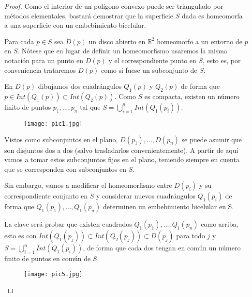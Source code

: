 \begin{proof}

	Como el interior de un polígono convexo puede ser triangulado por métodos elementales, bastará demostrar que la superficie $S$ dada es homeomorfa a una superficie con un embebimiento bicelular.

	Para cada $p \in S$ sea $D(p)$ un disco abierto en $\mathbb{R}^2$ homeomorfo a un entorno de $p$ en $S$. Nótese que en lugar de definir un homeomorfismo usaremos la misma notación para un punto en $D(p)$ y el correspondiente punto en $S$, esto es,  por conveniencia trataremos $D(p)$ como si fuese un subconjunto de $S$.

	En $D(p)$ dibujamos dos cuadrángulos $Q_{1}(p)$ y $Q_{2}(p)$ de forma que $p \in Int(Q_{1}(p)) \subset Int(Q_{2}(p))$. Como $S$ es  compacta, existen un número finito de puntos $p_{1},...,p_{n}$ tal que $S = \bigcup_{i = 1}^{n} Int(Q_{1}(p_{i}))$.

\begin{figure}[h]
\centering
\begin{minipage}[c]{\textwidth}
\centering
    \texttt{[image: pic1.jpg]}
\end{minipage}
\end{figure}

	Vistos como subconjuntos en el plano, $D(p_{1}),...,D(p_{n})$ se puede asumir que son disjuntos dos a dos (salvo trasladarlos convenientemente). A partir de aquí vamos a tomar estos subconjuntos fijos en el plano, teniendo siempre en cuenta que se corresponden con subconjuntos en $S$.

	Sin embargo, vamos a modificar el homeomorfismo entre $D(p_i)$ y su correspondiente conjunto en $S$ y considerar nuevos cuadrángulos $Q_{1}(p_i)$ de forma que $Q_{1}(p_{1}),...,Q_{1}(p_{n})$  determinen un embebimiento bicelular en S.

La clave será probar que existen cuadrados  $Q_{1}(p_{1}),...,Q_{1}(p_{n})$  como arriba, esto es con $Int(Q_{1}(p_j)) \subset Int(Q_{2}(p_j))\subset D(p_j)$ para todo $j$ y $S = \bigcup_{i = 1}^{n} Int(Q_{1}(p_{i}))$, de forma que  cada dos   tengan en común un número finito de puntos en común de $S$. 

\begin{figure}[h]
\centering
\begin{minipage}[c]{\textwidth}
\centering
    \texttt{[image: pic5.jpg]}
\end{minipage}
\end{figure}


\end{proof}
